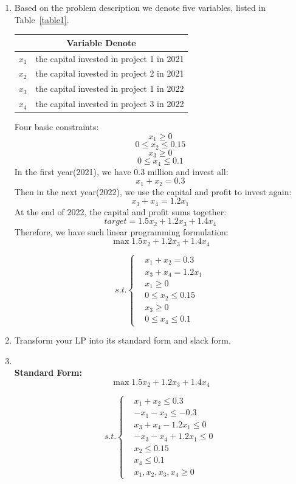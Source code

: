 \documentclass[12pt,a4paper]{article}
\makeatletter
\newtheorem*{solution}{Solution}
\theoremstyle{definition}
\renewenvironment{solution}[1][Solution] {\par\pushQED{\qed}\normalfont\topsep6\p@\@plus6\p@\relax\trivlist\item[\hskip\labelsep\bfseries#1\@addpunct{.}]\ignorespaces}{\popQED\endtrivlist\@endpefalse} \makeatother
\makeatother
\begin{document}
\begin{enumerate}
\begin{enumerate}
\begin{solution}
    Based on the problem description we denote five variables, listed in Table~\ref{table1}.
    \begin{center}
    \begin{tabular}{|c|c|}
    \hline
    \multicolumn{2}{|c|}{Variable Denote}\\
        \hline
        \label{table1}
      $x_1$   &  the capital invested in project 1 in 2021\\
      \hline
      $x_2$   &  the capital invested in project 2 in 2021\\
      \hline
      $x_3$   &  the capital invested in project 1 in 2022\\
      \hline
      $x_4$   &  the capital invested in project 3 in 2022 \\
      \hline
   
    \end{tabular}
    \end{center}
     Four basic constraints:
     $$
     x_1\geq 0
     $$
    $$
    0\leq x_2 \leq 0.15
    $$
    $$
    x_3 \geq 0
    $$
    $$
    0\leq x_4 \leq 0.1
    $$
    In the first year(2021), we have 0.3 million and invest all:
    $$
    x_1 + x_2 = 0.3
    $$
    Then in the next year(2022), we use the capital and profit to invest again:
    $$
    x_3 + x_4 = 1.2x_1
    $$
    At the end of 2022, the capital and profit sums together:
    $$
    target = 1.5x_2 + 1.2x_3 + 1.4x_4
    $$
    Therefore, we have such linear programming formulation:
    $$
    \max 1.5x_2 + 1.2x_3 + 1.4x_4
    $$
    
    $$
    s.t.\left\{
    \begin{aligned}
    &x_1 + x_2 = 0.3\\
    &x_3 + x_4 = 1.2x_1\\
    &x_1\geq 0\\
    &0\leq x_2 \leq 0.15\\
    &x_3 \geq 0\\
    &0\leq x_4 \leq 0.1
    \end{aligned}
    \right.
    $$
    \end{solution}
    \item
    Transform your LP into its standard form and slack form.
    \begin{solution}
    ~\\
    \textbf{Standard Form:}
    $$
    \max 1.5x_2 + 1.2x_3 + 1.4x_4
    $$
    
    $$
    s.t.\left\{
    \begin{aligned}
    &x_1 + x_2 \leq 0.3\\
    &-x_1 - x_2 \leq -0.3\\
    &x_3 + x_4 - 1.2x_1\leq 0\\
    &-x_3 - x_4 + 1.2x_1\leq 0\\
    &x_2 \leq 0.15\\
    &x_4 \leq 0.1\\
    &x_1,x_2,x_3,x_4\geq 0
    \end{aligned}
    \right.
    $$
    

\end{solution}
\end{enumerate}
\end{enumerate}
\end{document}
